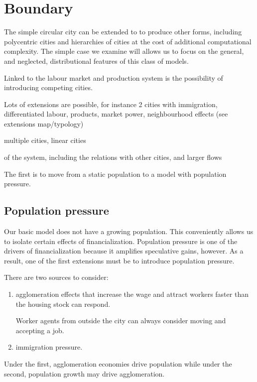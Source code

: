 \section{Boundary} %
The simple circular city can be extended to to produce other forms, including polycentric cities and hierarchies of cities at the cost of additional computational complexity. The simple case we examine will allows us to focus on the general, and neglected, distributional features of this class of models.

Linked to the labour market and production system is the possibility of introducing competing cities. 

Lots of  extensions are possible, for instance 2 cities with immigration, differentiated labour, products, market power, neighbourhood effects (see extensions map/typology)

multiple cities,
linear cities

 of the system, including the relations with other cities, and larger flows


The first is to move from a static population to a model with population pressure. %

\subsection{Population pressure} 
Our basic model does not have a growing population. This conveniently allows us to isolate certain effects of financialization. Population pressure is one of the drivers of financialization because it amplifies speculative gains, however. As a result, one of the first extensions must be  to introduce population pressure.

There are two sources to consider: 
\begin{enumerate}
\item agglomeration effects that increase the wage and attract workers faster than the housing stock can respond. 

Worker agents from outside the city can always consider moving and accepting a job. 
\item immigration pressure.
\end{enumerate}
Under the  first, agglomeration economies drive population while under the second, population growth may drive agglomeration.

